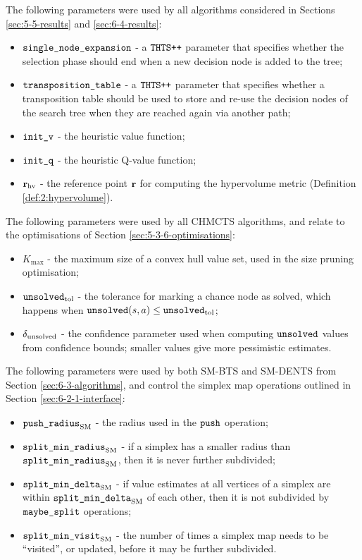     The following parameters were used by all algorithms considered in Sections \ref{sec:5-5-results} and \ref{sec:6-4-results}:
    \begin{itemize}
        \item ${\textnormal{\texttt{single\_node\_expansion}}}$ - a ${\textnormal{\texttt{THTS++}}}$ parameter that specifies whether the selection phase should end when a new decision node is added to the tree;
        \item ${\textnormal{\texttt{transposition\_table}}}$ - a ${\textnormal{\texttt{THTS++}}}$ parameter that specifies whether a transposition table should be used to store and re-use the decision nodes of the search tree when they are reached again via another path;
        \item ${\textnormal{\texttt{init\_v}}}$ - the heuristic value function;
        \item ${\textnormal{\texttt{init\_q}}}$ - the heuristic Q-value function;
        \item $\mathbf{r}_{\text{hv}}$ - the reference point $\mathbf{r}$ for computing the hypervolume metric (Definition \ref{def:2:hypervolume}).
    \end{itemize}
    
    The following parameters were used by all CHMCTS algorithms, and relate to the optimisations of Section \ref{sec:5-3-6-optimisations}:
    \begin{itemize}
        \item $K_{\max}$ - the maximum size of a convex hull value set, used in the size pruning optimisation;
        \item ${\textnormal{\texttt{unsolved}}_{\textnormal{tol}}}$ - the tolerance for marking a chance node as solved, which happens when ${\textnormal{\texttt{unsolved}}}(s,a)\leq{\textnormal{\texttt{unsolved}}_{\textnormal{tol}}}$;
        \item ${\delta_{\textnormal{unsolved}}}$ - the confidence parameter used when computing ${\textnormal{\texttt{unsolved}}}$ values from confidence bounds; smaller values give more pessimistic estimates.
    \end{itemize}

    The following parameters were used by both SM-BTS and SM-DENTS from Section \ref{sec:6-3-algorithms}, and control the simplex map operations outlined in Section \ref{sec:6-2-1-interface}:
    \begin{itemize}
        \item ${\textnormal{\texttt{push\_radius}}_{{\textnormal{SM}}}}$ - the radius used in the ${\textnormal{\texttt{push}}}$ operation;
        \item ${\textnormal{\texttt{split\_min\_radius}}_{{\textnormal{SM}}}}$ - if a simplex has a smaller radius than ${\textnormal{\texttt{split\_min\_radius}}_{{\textnormal{SM}}}}$, then it is never further subdivided; %
        \item ${\textnormal{\texttt{split\_min\_delta}}_{{\textnormal{SM}}}}$ - if value estimates at all vertices of a simplex are within ${\textnormal{\texttt{split\_min\_delta}}_{{\textnormal{SM}}}}$ of each other, then it is not subdivided by ${\textnormal{\texttt{maybe\_split}}}$ operations;
        \item ${\textnormal{\texttt{split\_min\_visit}}_{{\textnormal{SM}}}}$ - the number of times a simplex map needs to be ``visited'', or updated, before it may be further subdivided.
    \end{itemize}

